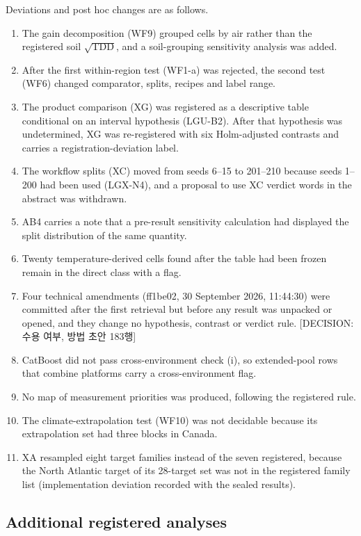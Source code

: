 Deviations and post hoc changes are as follows.
\begin{enumerate}
\item The gain decomposition (WF9) grouped cells by air rather than the registered soil $\sqrt{\mathrm{TDD}}$, and a soil-grouping sensitivity analysis was added.
\item After the first within-region test (WF1-a) was rejected, the second test (WF6) changed comparator, splits, recipes and label range.
\item The product comparison (XG) was registered as a descriptive table conditional on an interval hypothesis (LGU-B2). After that hypothesis was undetermined, XG was re-registered with six Holm-adjusted contrasts and carries a registration-deviation label.
\item The workflow splits (XC) moved from seeds 6--15 to 201--210 because seeds 1--200 had been used (LGX-N4), and a proposal to use XC verdict words in the abstract was withdrawn.
\item AB4 carries a note that a pre-result sensitivity calculation had displayed the split distribution of the same quantity.
\item Twenty temperature-derived cells found after the table had been frozen remain in the direct class with a flag.
\item Four technical amendments (ff1be02, 30 September 2026, 11:44:30) were committed after the first retrieval but before any result was unpacked or opened, and they change no hypothesis, contrast or verdict rule. [DECISION: 수용 여부, 방법 초안 183행]
\item CatBoost did not pass cross-environment check (i), so extended-pool rows that combine platforms carry a cross-environment flag.
\item No map of measurement priorities was produced, following the registered rule.
\item The climate-extrapolation test (WF10) was not decidable because its extrapolation set had three blocks in Canada.
\item XA resampled eight target families instead of the seven registered, because the North Atlantic target of its 28-target set was not in the registered family list (implementation deviation recorded with the sealed results).
\end{enumerate}

\subsection{Additional registered analyses}\label{sec:m-xbatch}

